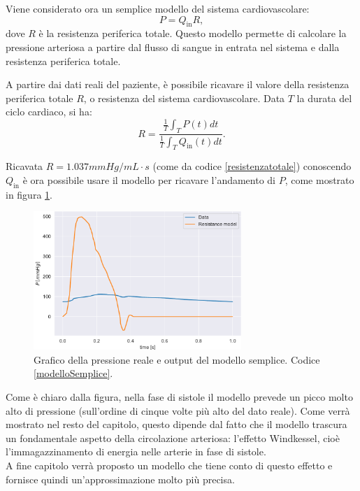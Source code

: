 Viene considerato ora un semplice modello del sistema cardiovascolare:
\[
P=Q_{\text{in}}R,
\]
dove $R$ è la resistenza periferica totale. Questo modello permette di calcolare la pressione arteriosa a partire dal flusso di sangue in entrata nel sistema e dalla resistenza periferica totale.



A partire dai dati reali del paziente, è possibile ricavare il valore della resistenza periferica totale $R$, o resistenza del sistema cardiovascolare. Data $T$ la durata del ciclo cardiaco, si ha:
\[
R = \frac{\frac{1}{T}\int_TP(t)dt}{\frac{1}{T}\int_TQ_{\text{in}}(t)dt}.
\]

\newpage

Ricavata $R=1.037 mmHg/mL\cdot s$ (come da codice \ref{resistenzatotale}) conoscendo $Q_{\text{in}}$ è ora possibile usare il modello per ricavare l'andamento di $P$, come mostrato in figura \ref{figModelloSemplic}.


\begin{figure}[h]
    \centering
    \includegraphics[width=0.7\textwidth]{images/Windkessel/modelloSemplice.pdf}
    \caption{Grafico della pressione reale e output del modello semplice. Codice \ref{modelloSemplice}.}
    \label{figModelloSemplic}
\end{figure}

Come è chiaro dalla figura, nella fase di sistole il modello prevede un picco molto alto di pressione (sull'ordine di cinque volte più alto del dato reale). Come verrà mostrato nel resto del capitolo, questo dipende dal fatto che il modello trascura un fondamentale aspetto della circolazione arteriosa: l'effetto Windkessel, cioè l'immagazzinamento di energia nelle arterie in fase di sistole.\\
A fine capitolo verrà proposto un modello che tiene conto di questo effetto e fornisce quindi un'approssimazione molto più precisa.


